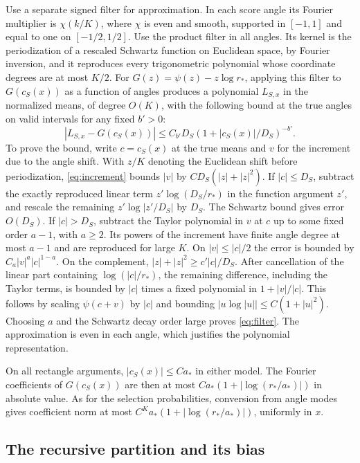 Use a separate signed filter for approximation. In each score
angle its Fourier multiplier is \(\chi(k/K)\), where
\(\chi\) is even and smooth, supported in \([-1,1]\) and
equal to one on \([-1/2,1/2]\). Use the product filter in all
angles. Its kernel is the periodization of a rescaled Schwartz
function on Euclidean space, by Fourier inversion, and it
reproduces every trigonometric polynomial whose coordinate
degrees are at most \(K/2\).
For \(G(z)=\psi(z)-z\log r_*\), applying this filter to
\(G(c_S(x))\) as a function of angles produces a polynomial
\(L_{S,x}\) in the normalized means, of degree \(O(K)\),
with the following bound at the true angles on valid intervals
for any fixed \(b'>0\):
\begin{equation}\label{eq:filter}
 |L_{S,x}-G(c_S(x))|\le
        C_{b'} D_S(1+|c_S(x)|/D_S)^{-b'}.
\end{equation}
To prove the bound, write \(c=c_S(x)\) at the true means
and \(v\) for the increment due to the angle shift.
With \(z/K\) denoting the Euclidean shift before
periodization, \eqref{eq:increment} bounds \(|v|\) by
\(CD_S(|z|+|z|^2)\).
If \(|c|\le D_S\), subtract the exactly reproduced linear term
\(z'\log(D_S/r_*)\) in the function argument \(z'\), and
rescale the remaining \(z'\log|z'/D_S|\) by \(D_S\).
The Schwartz bound gives error \(O(D_S)\). If \(|c|>D_S\),
subtract the Taylor polynomial in \(v\) at \(c\) up to some
fixed order \(a-1\), with \(a\ge2\). Its powers of the increment
have finite angle degree at most \(a-1\) and are reproduced
for large \(K\). On \(|v|\le |c|/2\) the error is bounded by
\(C_a|v|^a|c|^{1-a}\). On the complement,
\(|z|+|z|^2\ge c'|c|/D_S\). After cancellation of the linear
part containing \(\log(|c|/r_*)\), the remaining difference,
including the Taylor terms, is bounded by \(|c|\) times a fixed
polynomial in \(1+|v|/|c|\). This follows by scaling
\(\psi(c+v)\) by \(|c|\) and bounding
\(|u\log|u||\le C(1+|u|^2)\). Choosing \(a\) and the
Schwartz decay order large proves \eqref{eq:filter}.
The approximation is even in each angle, which justifies
the polynomial representation.

On all rectangle arguments, \(|c_S(x)|\le C a_*\) in
either model. The Fourier coefficients of \(G(c_S(x))\)
are then at most \(C a_*(1+|\log(r_*/a_*)|)\) in
absolute value. As for the selection probabilities, conversion
from angle modes gives coefficient norm at most
\(C^K a_*(1+|\log(r_*/a_*)|)\), uniformly in \(x\).

\subsection{The recursive partition and its bias}

